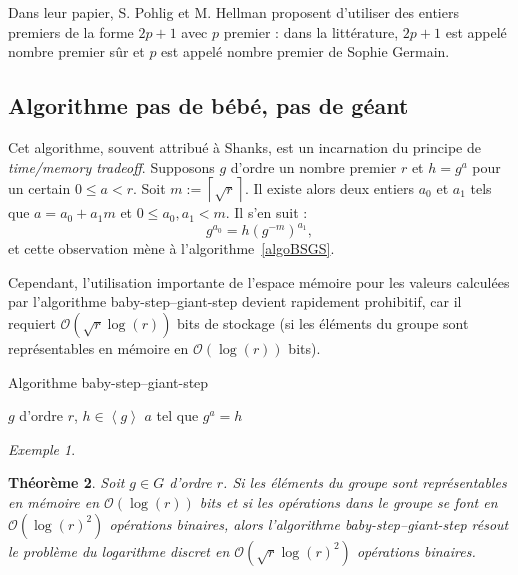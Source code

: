 \documentclass[a4paper, titlepage]{article}
\newtheorem{theo}{Théorème}[section]
\theoremstyle{definition}
\theoremstyle{remark}
\newtheorem{exem}[theo]{Exemple}
\def\O{\mathcal O}
\def\gen #1{\left\langle#1\right\rangle}
\def\ceil #1{\left\lceil#1\right\rceil}
\begin{document}
Dans leur papier, S. Pohlig et M. Hellman proposent d'utiliser des entiers premiers de la forme $2p + 1$ avec $p$ premier : dans la littérature, $2p + 1$ est appelé nombre premier sûr et $p$ est appelé nombre premier de Sophie Germain.

\subsection{Algorithme pas de bébé, pas de géant}
\label{BSGS}

Cet algorithme, souvent attribué à Shanks, est un incarnation du principe de \textit{time/memory tradeoff}. Supposons $g$ d'ordre un nombre premier $r$ et $h = g^a$ pour un certain $0 \leqslant a < r$. Soit $m := \ceil{\sqrt{r}}$. Il existe alors deux entiers $a_0$ et $a_1$ tels que $a = a_0 + a_1m$ et $0 \leqslant a_0, a_1 < m$. Il s'en suit :
$$g^{a_0} = h{(g^{-m})}^{a_1},$$
et cette observation mène à l'algorithme~\ref{algoBSGS}.

Cependant, l'utilisation importante de l'espace mémoire pour les valeurs calculées par l'algorithme baby-step--giant-step devient rapidement prohibitif, car il requiert $\O(\sqrt{r}\log(r))$ bits de stockage (si les éléments du groupe sont représentables en mémoire en $\O(\log(r))$ bits).

\begin{algorithm}[h]
\caption{Algorithme baby-step--giant-step}
\label{algoBSGS}
\begin{algorithmic}[1]
\REQUIRE $g$ d'ordre $r$, $h \in \gen{g}$
\ENSURE $a$ tel que $g^a = h$
\STATE{$m \gets \ceil{\sqrt{r}}$}
\ENDFOR
{}
\ENDWHILE
{}
\end{algorithmic}
\end{algorithm}

\begin{exem}

\end{exem}

\begin{theo}
Soit $g \in G$ d'ordre $r$. Si les éléments du groupe sont représentables en mémoire en $\O(\log(r))$ bits et si les opérations dans le groupe se font en $\O(\log(r)^2)$ opérations binaires, alors l'algorithme baby-step--giant-step résout le problème du logarithme discret en $\O(\sqrt{r}\log(r)^2)$ opérations binaires.
\end{theo}
\end{document}
